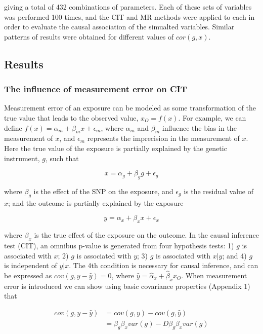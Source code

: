 \documentclass[]{article}
\begin{document}
giving a total of 432 combinations of parameters. Each of these sets of
variables was performed 100 times, and the CIT and MR methods were
applied to each in order to evaluate the causal association of the
simualted variables. Similar patterns of results were obtained for
different values of \(cor(g, x)\).

\subsection{Results}\label{results}

\subsubsection{The influence of measurement error on
CIT}\label{the-influence-of-measurement-error-on-cit}

Measurement error of an exposure can be modeled as some transformation
of the true value that leads to the observed value, \(x_O=f(x)\). For
example, we can define \(f(x) = \alpha_m + \beta_m x + \epsilon_m\),
where \(\alpha_m\) and \(\beta_m\) influence the bias in the measurement
of \(x\), and \(\epsilon_m\) represents the imprecision in the
measurement of \(x\). Here the true value of the exposure is partially
explained by the genetic instrument, \(g\), such that

\[
x = \alpha_g + \beta_g g + \epsilon_g
\]

where \(\beta_g\) is the effect of the SNP on the exposure, and
\(\epsilon_g\) is the residual value of \(x\); and the outcome is
partially explained by the exposure

\[
y = \alpha_x + \beta_x x + \epsilon_x
\]

where \(\beta_x\) is the true effect of the exposure on the outcome. In
the causal inference test (CIT), an omnibus p-value is generated from
four hypothesis tests: 1) \(g\) is associated with \(x\); 2) \(g\) is
associated with \(y\); 3) \(g\) is associated with \(x|y\); and 4) \(g\)
is independent of \(y|x\). The 4th condition is necessary for causal
inference, and can be expressed as \(cov(g, y - \hat{y}) = 0\), where
\(\hat{y} = \hat{\alpha}_x + \hat{\beta}_x x_O\). When measurement error
is introduced we can show using basic covariance properties (Appendix 1)
that

\[
\begin{aligned}
cov(g, y - \hat{y}) & = cov(g, y) - cov(g, \hat{y})  \\
                    & = \beta_g \beta_x var(g) - D\beta_g \beta_x var(g)
\end{aligned}
\]
\end{document}
